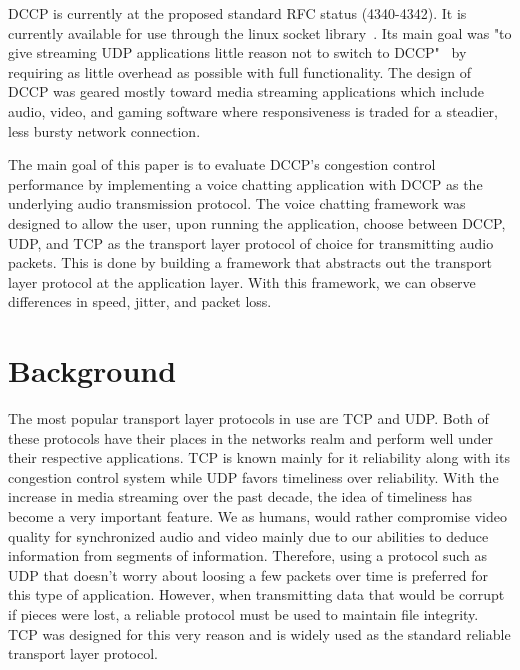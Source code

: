 \documentclass[letterpaper, 9 pt, balance, conference]{ieeeconf}
\begin{document}
DCCP is currently at the proposed standard RFC status (4340-4342).  It is 
currently available for use through the linux socket library~\cite{dccp_website}.  
Its main goal was "to give streaming UDP applications little reason
not to switch to DCCP"~\cite{dccp_wg} by requiring as little overhead as 
possible with full functionality.  The design of DCCP was geared mostly 
toward media streaming applications which include audio, video, and gaming
software where responsiveness is traded for a steadier, less bursty network
connection.

The main goal of this paper is to evaluate DCCP's congestion control performance
by implementing a voice chatting application with DCCP as the underlying audio
transmission protocol.  The voice chatting framework was designed to allow the
user, upon running the application, choose between DCCP, UDP, and TCP as the
transport layer protocol of choice for transmitting audio packets. This is done
by building a framework that abstracts out the transport layer protocol at the
application layer. With this framework, we can observe differences in speed, 
jitter, and packet loss.


\section{Background}
\label{sec:backg}

The most popular transport layer protocols in use are TCP and UDP.  Both of these
protocols have their places in the networks realm and perform well under their 
respective applications.  TCP is known mainly for it reliability along with its
congestion control system while UDP favors timeliness over reliability.  With the
increase in media streaming over the past decade, the idea of timeliness has
become a very important feature.  We as humans, would rather compromise video
quality for synchronized audio and video mainly due to our abilities to deduce
information from segments of information.  Therefore, using a protocol such as UDP
that doesn't worry about loosing a few packets over time is preferred for this type 
of application.  However, when transmitting data that would be corrupt if pieces 
were lost, a reliable protocol must be used to maintain file integrity.  TCP was
designed for this very reason and is widely used as the standard reliable transport
layer protocol.
\end{document}
